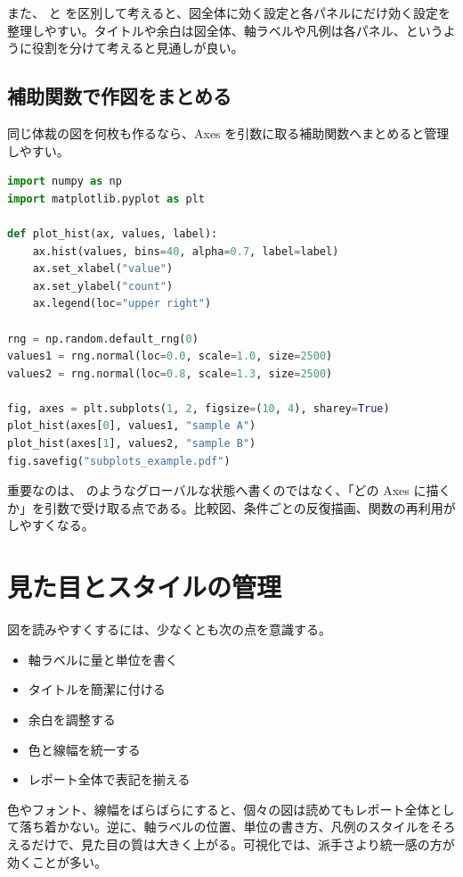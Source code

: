 また、 と  を区別して考えると、図全体に効く設定と各パネルにだけ効く設定を整理しやすい。タイトルや余白は図全体、軸ラベルや凡例は各パネル、というように役割を分けて考えると見通しが良い。

\subsection{補助関数で作図をまとめる}

同じ体裁の図を何枚も作るなら、Axes を引数に取る補助関数へまとめると管理しやすい。

\begin{lstlisting}[language=Python]
import numpy as np
import matplotlib.pyplot as plt

def plot_hist(ax, values, label):
    ax.hist(values, bins=40, alpha=0.7, label=label)
    ax.set_xlabel("value")
    ax.set_ylabel("count")
    ax.legend(loc="upper right")

rng = np.random.default_rng(0)
values1 = rng.normal(loc=0.0, scale=1.0, size=2500)
values2 = rng.normal(loc=0.8, scale=1.3, size=2500)

fig, axes = plt.subplots(1, 2, figsize=(10, 4), sharey=True)
plot_hist(axes[0], values1, "sample A")
plot_hist(axes[1], values2, "sample B")
fig.savefig("subplots_example.pdf")
\end{lstlisting}

重要なのは、 のようなグローバルな状態へ書くのではなく、「どの Axes に描くか」を引数で受け取る点である。比較図、条件ごとの反復描画、関数の再利用がしやすくなる。

\section{見た目とスタイルの管理}

図を読みやすくするには、少なくとも次の点を意識する。

\begin{itemize}
\item 軸ラベルに量と単位を書く
\item タイトルを簡潔に付ける
\item 余白を調整する
\item 色と線幅を統一する
\item レポート全体で表記を揃える
\end{itemize}

色やフォント、線幅をばらばらにすると、個々の図は読めてもレポート全体として落ち着かない。逆に、軸ラベルの位置、単位の書き方、凡例のスタイルをそろえるだけで、見た目の質は大きく上がる。可視化では、派手さより統一感の方が効くことが多い。

